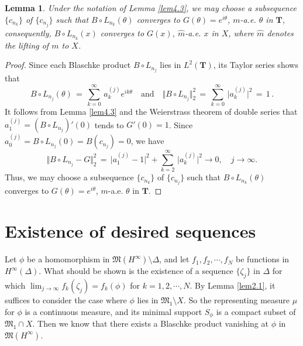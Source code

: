 \documentclass[12pt]{amsart}
\theoremstyle{plain}
\newtheorem{lem}{Lemma}[section]
\numberwithin{equation}{section}
\begin{document}
\begin{lem}
\label{lem4.4}
Under the notation of Lemma \ref{lem4.3}, we may choose a subsequence
$\{c_{n_k}\}$ of $\{c_{n_j}\}$ such that $B\circ L _{n_k}(\theta)$
converges to $G(\theta)= e^{i\theta}$, $m$-a.e. $\theta$ in
$\mathbf{T}$, consequently, $B\circ L _{n_k}(x)$
converges to $G(x)$, $\widehat{m}$-a.e. $x$ in
$X$, where $\widehat{m}$ denotes the lifting of $m$ to $X$.
\end{lem}

\begin{proof}
Since each Blaschke product $B\circ L _{n_j}$ lies in
$L^2(\mathbf{T})$, its Taylor series shows that
$$
B\circ L _{n_j}(\theta) \,=\, \sum_{k=0}^{\infty}\, a_k^{(j)}
e^{ik\theta}\quad \text{and} \quad
\Vert B\circ L _{n_j}\Vert^2_2\,=\,\sum_{k=0}^{\infty}\, \vert
a_k^{(j)}\vert^2 \,=\,1\,.
$$
It follows from Lemma \ref{lem4.3} and the Weierstrass theorem
of double series that $a_1^{(j)} = (B\circ L _{n_j})'(0)$
tends to $G'(0)=1$. Since $a_0^{(j)}=B\circ L _{n_j}(0)
= B(c_{n_j})=0$, we have
$$
\Vert B\circ L _{n_j} - G \Vert^2_2 \,=\, \vert a_1^{(j)} - 1\vert^2 + \sum_{k=2}^{\infty}\, \vert
a_k^{(j)}\vert^2 \rightarrow 0, \quad j \to \infty.
$$
Thus, we may choose a subsequence $\{c_{n_k}\}$ of $\{c_{n_j}\}$
such that $B\circ L _{n_k}(\theta)$
converges to $G(\theta)= e^{i\theta}$, $m$-a.e. $\theta$ in
$\mathbf{T}$.
\end{proof}













\bigskip
\bigskip
\section{Existence of desired sequences}
\label{S5}
Let $\phi$ be a homomorphism in
$\mathfrak{M}(H^\infty)\setminus \Delta$,
and let $f_1, f_2, \cdots, f_N $ be functions in
$H^\infty(\Delta)$. What should be shown is the existence of a
sequence $\{\zeta_j\}$ in $\Delta$ for which $\lim_{j\to \infty} f_k(\zeta_j)
= f_k(\phi)$ for $k=1,2,\cdots, N$. By Lemma \ref{lem2.1}, it suffices to
consider the case where $\phi$ lies in $\mathfrak{M}_1\setminus X$.
So the representing measure $\mu$ for $\phi$ is a continuous
measure, and its minimal support $S_\phi$ is a compact subset of
$\mathfrak{M}_1\cap X$. Then we know that there exists
a Blaschke product vanishing at $\phi$ in $\mathfrak{M}(H^\infty)$.
\end{document}
